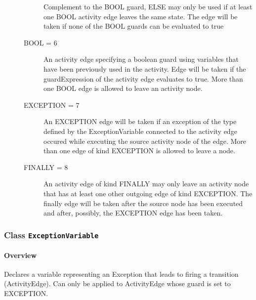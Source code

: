 \begin{description}
\begin{description}
Complement to the BOOL guard, ELSE may only be used if at least one BOOL activity edge leaves the same state. The edge will be taken if none of the BOOL guards can be evaluated to true	

		\item[BOOL = 6]
		\hspace{\fill}
		\nopagebreak
		
An activity edge specifying a boolean guard using variables that have been previously used in the activity. Edge will be taken if the guardExpression of the activity edge evaluates to true. More than one BOOL edge is allowed to leave an activity node.	

		\item[EXCEPTION = 7]
		\hspace{\fill}
		\nopagebreak
		
An EXCEPTION edge will be taken if an exception of the  type defined by the ExceptionVariable connected to the activity edge occured while executing the source activity node of the edge. More than one edge of kind EXCEPTION is allowed to leave a node.	

		\item[FINALLY = 8]
		\hspace{\fill}
		\nopagebreak
		
An activity edge of kind FINALLY may only leave an activity node that has at least one other outgoing edge of kind EXCEPTION. The finally edge will be taken after the source node has been executed and after, possibly, the EXCEPTION edge has been taken.	
 
	\end{description}

\end{description}



\subsubsection{\Large{Class \bfseries \texttt{ExceptionVariable}\normalfont}}
\label{cls:storydiagrams::activities::ExceptionVariable} 
\paragraph{Overview}

	
			
Declares a variable representing an Exception that leads to firing a transition (ActivityEdge). Can only be applied to ActivityEdge whose guard is set to EXCEPTION.	
		
